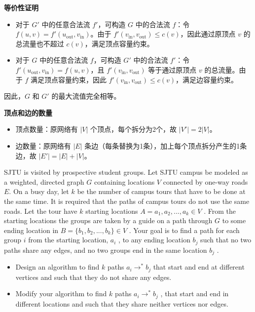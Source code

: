 \documentclass{article}
\newcounter{exercise}
\newcommand{\<}{
    \langle}
\renewcommand{\>}{
    \rangle}
\begin{document}
{\noindent\textbf{等价性证明}
\begin{itemize}
    \item 对于 $G'$ 中的任意合法流 $f'$，可构造 $G$ 中的合法流 $f$：令 $f(u,v) = f'(u_{\text{out}}, v_{\text{in}})$。由于 $f'(v_{\text{in}}, v_{\text{out}}) \leq c(v)$，因此通过原顶点 $v$ 的总流量也不超过 $c(v)$，满足顶点容量约束。
    \item 对于 $G$ 中的任意合法流 $f$，可构造 $G'$ 中的合法流 $f'$：令 $f'(u_{\text{out}}, v_{\text{in}}) = f(u,v)$，且 $f'(v_{\text{in}}, v_{\text{out}})$ 等于通过原顶点 $v$ 的总流量。由于 $f$ 满足顶点容量约束，因此 $f'(v_{\text{in}}, v_{\text{out}}) \leq c(v)$，满足边容量约束。
\end{itemize}
因此，$G$ 和 $G'$ 的最大流值完全相等。

\noindent\textbf{顶点和边的数量}
\begin{itemize}
    \item 顶点数量：原网络有 $|V|$ 个顶点，每个拆分为2个，故 $|V'| = 2|V|$。
    \item 边数量：原网络有 $|E|$ 条边（每条替换为1条），加上每个顶点拆分产生的1条边，故 $|E'| = |E| + |V|$。
\end{itemize}


\begin{exercise}
SJTU is visited by prospective student groups. Let SJTU campus be modeled
as a weighted, directed graph $G$ containing locations $V$ connected by one-way
roads $E$. On a busy day, let $k$ be the number of campus tours that have to be
done at the same time. It is required that the paths of campus tours do not
use the same roads. Let the tour have $k$ starting locations $A = { a_1, a_2,..., a_k
} \in V$ . From the starting locations the groups are taken by a guide on a path
through $G$ to some ending location in $B =\{ b_1, b_2,..., b_k\} \in V$ . Your goal is
to find a path for each group $i$ from the starting location, $a_i$
, to any ending
location $b_j$ such that no two paths share any edges, and no two groups end in
the same location $b_j$ .


\begin{itemize}
\item Design an algorithm to find $k$ paths $a_i \rightarrow^* b_j$ that start and end at different
vertices and such that they do not share any edges.


\item Modify your algorithm to find $k$ paths $a_i \rightarrow^* b_j$ , that start and end in different
locations and such that they share neither vertices nor edges.


\end{itemize}
\end{exercise}}
\end{document}
